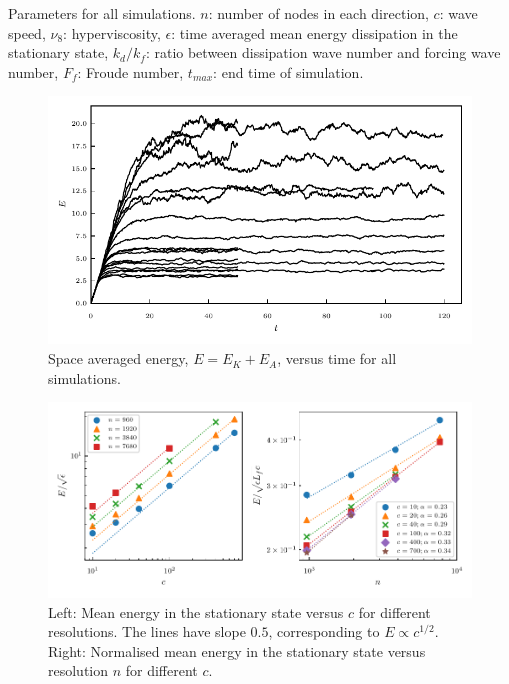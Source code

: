 \documentclass{jfm}
\begin{document}
\begin{table}
\begin{center}
\vskip 3mm
\caption{Parameters for all simulations. $ n $: number of nodes in each
direction, $ c $: wave speed, $ \nu_8 $: hyperviscosity, $ \epsilon $: time
averaged mean energy dissipation in the stationary state, $ k_{d}/ k_f $: ratio
between dissipation wave number and forcing wave number, $ F_f $: Froude
number, $ t_{max} $: end time of simulation.}
\end{center}
\end{table}





\begin{figure}
\centerline{\includegraphics[width=5.12in]{../Pyfig/fig_Emean_time}}
\caption{Space averaged energy, $E = E_K + E_A $, versus time for all
simulations. }
\label{fig_Evstime}
\end{figure}

\begin{figure}
\centerline{\includegraphics[width=5.8in]{../Pyfig/fig_energy_w}}
\caption{Left: Mean energy in the stationary state versus $ c $ for different
resolutions. The lines have slope $ 0.5 $, corresponding to $ E \propto c^{1/2}
$. Right: Normalised mean energy in the stationary state versus resolution $ n
$ for different $ c $.}
\label{MeanE}
\end{figure}
\end{document}
